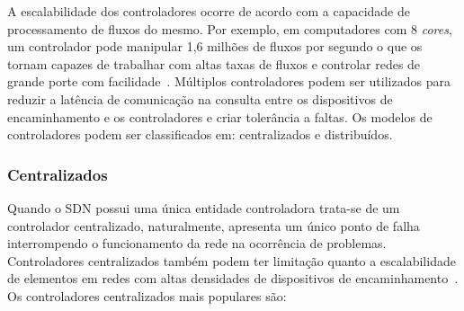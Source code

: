 A escalabilidade dos controladores ocorre de acordo com a capacidade de processamento de fluxos do mesmo. Por exemplo, em computadores com 8 \textit{cores}, um controlador pode manipular 1,6 milhões de fluxos por segundo o que os tornam capazes de trabalhar com altas taxas de fluxos e controlar  redes de grande porte com facilidade~\cite{nunes-2014}. Múltiplos controladores podem ser utilizados para reduzir a latência de comunicação na consulta entre os dispositivos de encaminhamento e os controladores e criar tolerância a faltas. Os modelos de controladores podem ser classificados em: centralizados e distribuídos. \\

\subsubsection{Centralizados}%
Quando o SDN possui uma única entidade controladora trata-se de um controlador centralizado, naturalmente, apresenta um único ponto de falha interrompendo o funcionamento da rede na ocorrência de problemas. Controladores centralizados também podem ter limitação quanto a escalabilidade de elementos em redes com altas densidades de dispositivos de encaminhamento~\cite{kreutz2015}. Os controladores centralizados mais populares são: 


